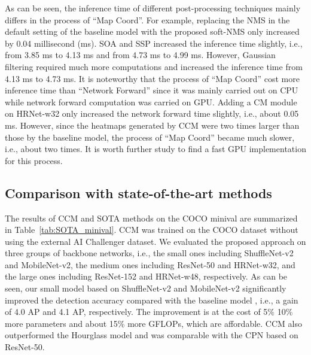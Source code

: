 \documentclass[twocolumn]{svjour3}          \smartqed  \usepackage{natbib}
\begin{document}
As can be seen, the inference time of different post-processing techniques mainly differs in the process of ``Map  Coord''. For example, replacing the NMS in the default setting of the baseline model \citep{xiao2018simple} with the proposed soft-NMS only increased by 0.04 millisecond (ms). SOA and SSP increased the inference time slightly, i.e., from 3.85 ms to 4.13 ms and from 4.73 ms to 4.99 ms. However, Gaussian filtering required much more computations and increased the inference time from 4.13 ms to 4.73 ms. It is noteworthy that the process of ``Map  Coord'' cost more inference time than ``Network Forward'' since it was mainly carried out on CPU while network forward computation was carried on GPU. Adding a CM module on HRNet-w32 only increased the network forward time slightly, i.e., about 0.05 ms. However, since the heatmaps generated by CCM were two times larger than those by the baseline model, the process of ``Map  Coord'' became much slower, i.e., about two times. It is worth further study to find a fast GPU implementation for this process.

\subsection{Comparison with state-of-the-art methods}
\label{subsec:mainResults}
The results of CCM and SOTA methods on the COCO minival are summarized in Table~\ref{tab:SOTA_minival}. CCM was trained on the COCO dataset without using the external AI Challenger dataset. We evaluated the proposed approach on three groups of backbone networks, i.e., the small ones including ShuffleNet-v2 and MobileNet-v2, the medium ones including ResNet-50 and HRNet-w32, and the large ones including ResNet-152 and HRNet-w48, respectively. As can be seen, our small model based on ShuffleNet-v2 and MobileNet-v2 significantly improved the detection accuracy compared with the baseline model \citep{xiao2018simple}, i.e., a gain of 4.0 AP and 4.1 AP, respectively. The improvement is at the cost of 5\%  10\% more parameters and about 15\% more GFLOPs, which are affordable. CCM also outperformed the Hourglass model \citep{newell2016stacked} and was comparable with the CPN \citep{chen2018cascaded} based on ResNet-50. 
\end{document}
